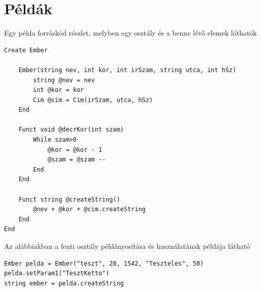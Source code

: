\section{Példák}

Egy példa forráskód részlet, melyben egy osztály és a benne lévő elemek láthatók

\begin{verbatim}
Create Ember
	
	Ember(string nev, int kor, int irSzam, string utca, int hSz)
		string @nev = nev
		int @kor = kor
		Cim @cim = Cim(irSzam, utca, hSz)
	End
		
	Funct void @decrKor(int szam)
		While szam>0
			@kor = @kor - 1
			@szam = @szam --
		End
	End
	
	Funct string @createString()
		@nev + @kor + @cim.createString
	End
End
\end{verbatim}
		
Az alábbiakban a fenti osztály példányosítása és használatának példája látható

\begin{verbatim}
Ember pelda = Ember("teszt", 20, 1542, "Teszteles", 50)
pelda.setParam1("TesztKetto")
string ember = pelda.createString
\end{verbatim}
